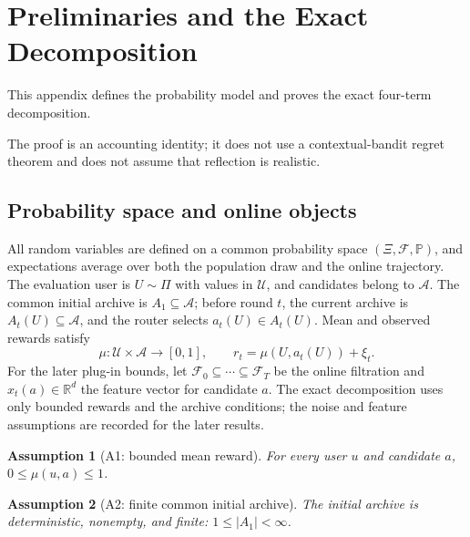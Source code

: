 \documentclass{article} %
\newtheorem{assumption}{Assumption}
\begin{document}



\clearpage

\appendix

\section{Preliminaries and the Exact Decomposition}

\label{app:proofs}

This appendix defines the probability model and proves the exact four-term decomposition.

The proof is an accounting identity; it does not use a contextual-bandit regret theorem and does not assume that reflection is realistic.

\subsection{Probability space and online objects}

All random variables are defined on a common probability space
\((\Xi,\mathcal F,\mathbb P)\), and expectations average over both the
population draw and the online trajectory.  The evaluation user is
\(U\sim\Pi\) with values in \(\mathcal U\), and candidates belong to
\(\mathcal A\).  The common initial archive is \(A_1\subseteq\mathcal A\);
before round \(t\), the current archive is \(A_t(U)\subseteq\mathcal A\), and
the router selects \(a_t(U)\in A_t(U)\).  Mean and observed rewards satisfy
\begin{equation}
\mu:\mathcal U\times\mathcal A\to[0,1],
\qquad
r_t=\mu(U,a_t(U))+\xi_t.
\end{equation}
For the later plug-in bounds, let
\(\mathcal F_0\subseteq\cdots\subseteq\mathcal F_T\) be the online filtration
and \(x_t(a)\in\mathbb R^d\) the feature vector for candidate \(a\).  The exact
decomposition uses only bounded rewards and the archive conditions; the noise
and feature assumptions are recorded for the later results.

\begin{assumption}[A1: bounded mean reward]
\label{ass:app-bounded}
For every user \(u\) and candidate \(a\),
\(0\leq\mu(u,a)\leq 1\).
\end{assumption}

\begin{assumption}[A2: finite common initial archive]
\label{ass:app-finite-initial}
The initial archive is deterministic, nonempty, and finite:
\(1\leq |A_1|<\infty\).
\end{assumption}
\end{document}
